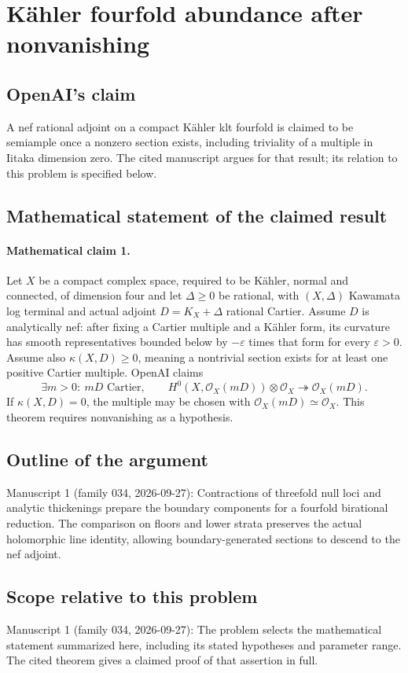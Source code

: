 \documentclass[11pt]{article}
\begin{document}
\section*{Kähler fourfold abundance after nonvanishing}

\subsection{OpenAI's claim}
A nef rational adjoint on a compact Kähler klt fourfold is claimed to be semiample once a nonzero section exists, including triviality of a multiple in Iitaka dimension zero. The cited manuscript argues for that result; its relation to this problem is specified below.

\subsection{Mathematical statement of the claimed result}
\paragraph{Mathematical claim 1.} Let $X$ be a compact complex space, required to be Kähler, normal and connected, of dimension four and let $\Delta\ge0$ be rational, with $(X,\Delta)$ Kawamata log terminal and actual adjoint $D=K_X+\Delta$ rational Cartier. Assume $D$ is analytically nef: after fixing a Cartier multiple and a Kähler form, its curvature has smooth representatives bounded below by $-\varepsilon$ times that form for every $\varepsilon>0$. Assume also $\kappa(X,D)\ge0$, meaning a nontrivial section exists for at least one positive Cartier multiple. OpenAI claims
\[
\exists m>0:\ mD\text{ Cartier},\qquad
H^0(X,\mathcal O_X(mD))\otimes\mathcal O_X\twoheadrightarrow\mathcal O_X(mD).
\]
If $\kappa(X,D)=0$, the multiple may be chosen with $\mathcal O_X(mD)\simeq\mathcal O_X$. This theorem requires nonvanishing as a hypothesis.

\subsection{Outline of the argument}
Manuscript 1 (family 034, 2026-09-27): Contractions of threefold null loci and analytic thickenings prepare the boundary components for a fourfold birational reduction. The comparison on floors and lower strata preserves the actual holomorphic line identity, allowing boundary-generated sections to descend to the nef adjoint.

\subsection{Scope relative to this problem}
Manuscript 1 (family 034, 2026-09-27): The problem selects the mathematical statement summarized here, including its stated hypotheses and parameter range. The cited theorem gives a claimed proof of that assertion in full.
\end{document}
